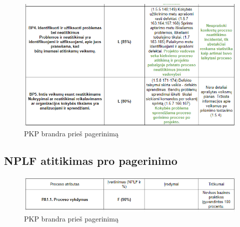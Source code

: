 \documentclass{VUMIFPSkursinis}
\begin{document}
	\begin{figure}[htbp]
		\includegraphics[scale=0.9]{img/sup1two}
		\caption{PKP brandra prieš pagerinimą} %
		\label{img:pkpPries}
	\end{figure}	

	\subsection{NPLF atitikimas pro pagerinimo}

	\begin{figure}[htbp]
		\includegraphics[scale=0.9]{img/sup1three}
		\caption{PKP brandra prieš pagerinimą} %
		\label{img:pkpPries}
	\end{figure}	
\end{document}
